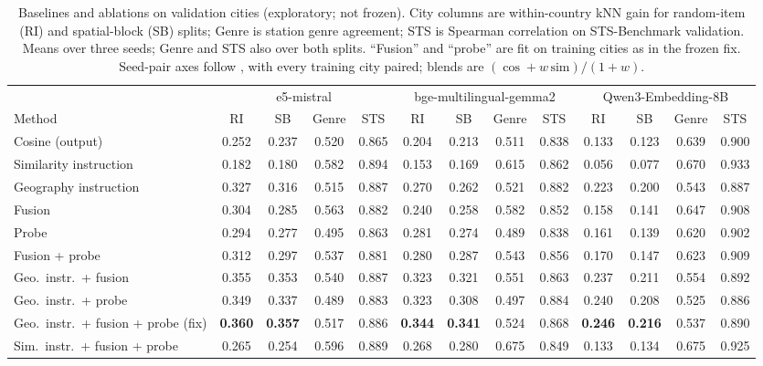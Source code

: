 \begin{table}[t]
\centering
\scriptsize
\setlength{\tabcolsep}{2.5pt}
\caption{Baselines and ablations on validation cities (exploratory; not frozen). City columns are within-country kNN gain for random-item (RI) and spatial-block (SB) splits; Genre is station genre agreement; STS is Spearman correlation on STS-Benchmark validation. Means over three seeds; Genre and STS also over both splits. ``Fusion'' and ``probe'' are fit on training cities as in the frozen fix. Seed-pair axes follow \citet{feuerstein2026recovering}, with every training city paired; blends are $(\cos + w\,\mathrm{sim})/(1+w)$.}
\label{tab:baselines}
\begin{tabular}{@{}lcccccccccccc@{}}
\toprule
& \multicolumn{4}{c}{e5-mistral} & \multicolumn{4}{c}{bge-multilingual-gemma2} & \multicolumn{4}{c}{Qwen3-Embedding-8B} \\
\cmidrule(lr){2-5}\cmidrule(lr){6-9}\cmidrule(lr){10-13}
Method & RI & SB & Genre & STS & RI & SB & Genre & STS & RI & SB & Genre & STS \\
\midrule
Cosine (output) & 0.252 & 0.237 & 0.520 & 0.865 & 0.204 & 0.213 & 0.511 & 0.838 & 0.133 & 0.123 & 0.639 & 0.900 \\
Similarity instruction & 0.182 & 0.180 & 0.582 & 0.894 & 0.153 & 0.169 & 0.615 & 0.862 & 0.056 & 0.077 & 0.670 & 0.933 \\
Geography instruction & 0.327 & 0.316 & 0.515 & 0.887 & 0.270 & 0.262 & 0.521 & 0.882 & 0.223 & 0.200 & 0.543 & 0.887 \\
\midrule
Fusion & 0.304 & 0.285 & 0.563 & 0.882 & 0.240 & 0.258 & 0.582 & 0.852 & 0.158 & 0.141 & 0.647 & 0.908 \\
Probe & 0.294 & 0.277 & 0.495 & 0.863 & 0.281 & 0.274 & 0.489 & 0.838 & 0.161 & 0.139 & 0.620 & 0.902 \\
Fusion + probe & 0.312 & 0.297 & 0.537 & 0.881 & 0.280 & 0.287 & 0.543 & 0.856 & 0.170 & 0.147 & 0.623 & 0.909 \\
Geo.\ instr.\ + fusion & 0.355 & 0.353 & 0.540 & 0.887 & 0.323 & 0.321 & 0.551 & 0.863 & 0.237 & 0.211 & 0.554 & 0.892 \\
Geo.\ instr.\ + probe & 0.349 & 0.337 & 0.489 & 0.883 & 0.323 & 0.308 & 0.497 & 0.884 & 0.240 & 0.208 & 0.525 & 0.886 \\
Geo.\ instr.\ + fusion + probe (fix) & \textbf{0.360} & \textbf{0.357} & 0.517 & 0.886 & \textbf{0.344} & \textbf{0.341} & 0.524 & 0.868 & \textbf{0.246} & \textbf{0.216} & 0.537 & 0.890 \\
Sim.\ instr.\ + fusion + probe & 0.265 & 0.254 & 0.596 & 0.889 & 0.268 & 0.280 & 0.675 & 0.849 & 0.133 & 0.134 & 0.675 & 0.925 \\

\end{tabular}
\end{table}
